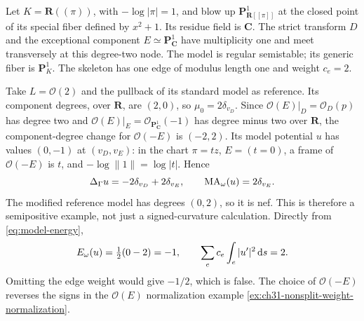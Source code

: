 \begin{example}
\label{ex:ch26-nonsplit-weighted-energy}
Let \(K=\mathbf R((\pi))\), with \(-\log|\pi|=1\), and blow up
\(\mathbf P^1_{\mathbf R[[\pi]]}\) at the closed point of its special
fiber defined by \(x^2+1\).  Its residue field is \(\mathbf C\).
The strict transform \(D\) and the exceptional component
\(E\simeq\mathbf P^1_{\mathbf C}\) have multiplicity one and meet
transversely at this degree-two node.  The model is regular semistable;
its generic fiber is \(\mathbf P^1_K\).  The skeleton has one edge of
modulus length one and weight \(c_e=2\).

Take \(L=\mathcal O(2)\) and the pullback of its standard model as
reference.  Its component degrees, over \(\mathbf R\), are \((2,0)\),
so \(\mu_0=2\delta_{v_D}\).  Since
\(\mathcal O(E)|_D=\mathcal O_D(p)\) has degree two and
\(\mathcal O(E)|_E=\mathcal O_{\mathbf P^1_{\mathbf C}}(-1)\) has
degree minus two over \(\mathbf R\), the component-degree change for
\(\mathcal O(-E)\) is \((-2,2)\).  Its model potential \(u\) has
values \((0,-1)\) at \((v_D,v_E)\): in the chart \(\pi=t z\),
\(E=(t=0)\), a frame of \(\mathcal O(-E)\) is \(t\), and
\(-\log\lVert1\rVert=\log|t|\).
Hence
\[
 \Delta_\Gamma u=-2\delta_{v_D}+2\delta_{v_E},\qquad
 \operatorname{MA}_\omega(u)=2\delta_{v_E}.
\]
The modified reference model has degrees \((0,2)\), so it is nef.
This is therefore a semipositive example, not just a signed-curvature
calculation.  Directly from \eqref{eq:model-energy},
\[
 E_\omega(u)=\tfrac12(0-2)=-1,
 \qquad
 \sum_e c_e\int_e|u'|^2\,\mathrm d s=2.
\]
Omitting the edge weight would give \(-1/2\), which is false.
The choice of \(\mathcal O(-E)\) reverses the signs in the
\(\mathcal O(E)\) normalization example
\cref{ex:ch31-nonsplit-weight-normalization}.
\end{example}
